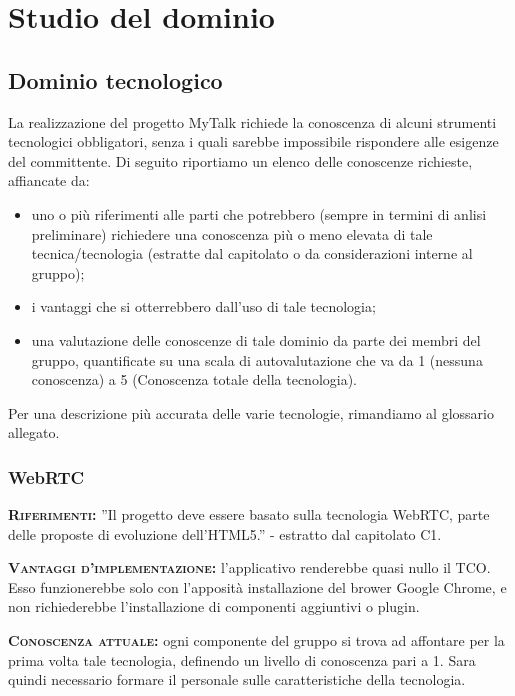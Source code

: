 \section{Studio del dominio}

\subsection{Dominio tecnologico}
La realizzazione del progetto MyTalk richiede la conoscenza di alcuni strumenti tecnologici obbligatori, senza i quali sarebbe impossibile rispondere alle esigenze del committente. Di seguito riportiamo un elenco delle conoscenze richieste, affiancate da:

\begin{itemize}
	\item uno o più riferimenti alle parti che potrebbero (sempre in termini di anlisi preliminare) richiedere una conoscenza più o meno elevata di tale tecnica/tecnologia (estratte dal capitolato o da considerazioni interne al gruppo);
	\item i vantaggi che si otterrebbero dall'uso di tale tecnologia;
	\item una valutazione delle conoscenze di tale dominio da parte dei membri del gruppo, quantificate su una scala di autovalutazione che va da 1 (nessuna conoscenza) a 5 (Conoscenza totale della tecnologia).
\end{itemize}
Per una descrizione più accurata delle varie tecnologie, rimandiamo al glossario allegato.

\subsubsection{WebRTC}
\begin{description}
	\item{\scshape\bfseries Riferimenti:} ''Il progetto deve essere basato sulla tecnologia WebRTC, parte delle proposte di evoluzione dell'HTML5.'' - estratto dal capitolato C1.

	\item{\scshape\bfseries Vantaggi d'implementazione:} l'applicativo renderebbe quasi nullo il TCO. Esso funzionerebbe solo con l'apposità installazione del brower Google Chrome, e non richiederebbe l'installazione di componenti aggiuntivi o plugin.
	
	\item{\scshape\bfseries Conoscenza attuale:} ogni componente del gruppo si trova ad affontare per la prima volta tale tecnologia, definendo un livello di conoscenza pari a 1. Sara quindi necessario formare il personale sulle caratteristiche della tecnologia.
\end{description}

